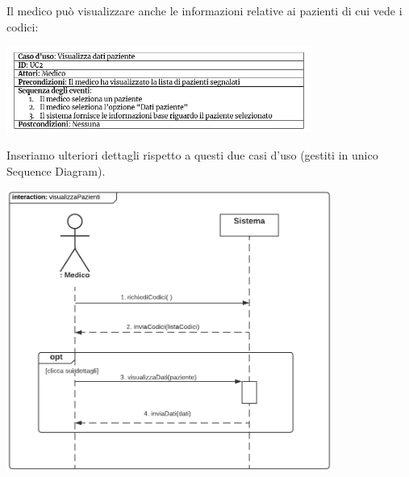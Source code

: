 \documentclass[11pt]{article}
\begin{document}
    \newpage
    Il medico può visualizzare anche le informazioni relative ai pazienti di cui vede i codici:
        \begin{center}
            \includegraphics[width=0.75\textwidth]{pictures/UC2.png}
        \end{center}
        Inseriamo ulteriori dettagli rispetto a questi due casi d'uso (gestiti in unico Sequence Diagram).
        \begin{center}
            \includegraphics[width=0.80\textwidth]{pictures/SDMedico2_listaPazienti.png}
        \end{center}
\end{document}
